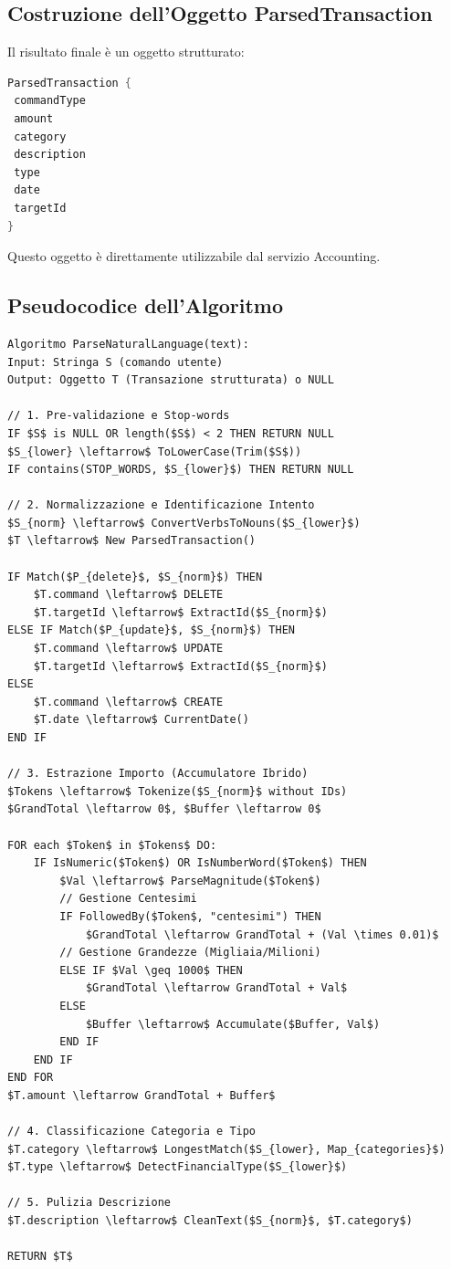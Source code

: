 \subsection{Costruzione dell'Oggetto ParsedTransaction}

Il risultato finale è un oggetto strutturato:

\bigskip

\begin{lstlisting}[language=Java]
ParsedTransaction {
 commandType
 amount
 category
 description
 type
 date
 targetId
}
\end{lstlisting}

Questo oggetto è direttamente utilizzabile dal servizio Accounting.

\subsection{Pseudocodice dell'Algoritmo}

\begin{lstlisting}[mathescape=true, basicstyle=\small\ttfamily]
Algoritmo ParseNaturalLanguage(text):
Input: Stringa S (comando utente)
Output: Oggetto T (Transazione strutturata) o NULL

// 1. Pre-validazione e Stop-words
IF $S$ is NULL OR length($S$) < 2 THEN RETURN NULL
$S_{lower} \leftarrow$ ToLowerCase(Trim($S$))
IF contains(STOP_WORDS, $S_{lower}$) THEN RETURN NULL

// 2. Normalizzazione e Identificazione Intento
$S_{norm} \leftarrow$ ConvertVerbsToNouns($S_{lower}$)
$T \leftarrow$ New ParsedTransaction()

IF Match($P_{delete}$, $S_{norm}$) THEN 
    $T.command \leftarrow$ DELETE
    $T.targetId \leftarrow$ ExtractId($S_{norm}$)
ELSE IF Match($P_{update}$, $S_{norm}$) THEN
    $T.command \leftarrow$ UPDATE
    $T.targetId \leftarrow$ ExtractId($S_{norm}$)
ELSE
    $T.command \leftarrow$ CREATE
    $T.date \leftarrow$ CurrentDate()
END IF

// 3. Estrazione Importo (Accumulatore Ibrido)
$Tokens \leftarrow$ Tokenize($S_{norm}$ without IDs)
$GrandTotal \leftarrow 0$, $Buffer \leftarrow 0$

FOR each $Token$ in $Tokens$ DO:
    IF IsNumeric($Token$) OR IsNumberWord($Token$) THEN
        $Val \leftarrow$ ParseMagnitude($Token$)
        // Gestione Centesimi
        IF FollowedBy($Token$, "centesimi") THEN
            $GrandTotal \leftarrow GrandTotal + (Val \times 0.01)$
        // Gestione Grandezze (Migliaia/Milioni)
        ELSE IF $Val \geq 1000$ THEN
            $GrandTotal \leftarrow GrandTotal + Val$
        ELSE
            $Buffer \leftarrow$ Accumulate($Buffer, Val$)
        END IF
    END IF
END FOR
$T.amount \leftarrow GrandTotal + Buffer$

// 4. Classificazione Categoria e Tipo
$T.category \leftarrow$ LongestMatch($S_{lower}, Map_{categories}$)
$T.type \leftarrow$ DetectFinancialType($S_{lower}$)

// 5. Pulizia Descrizione
$T.description \leftarrow$ CleanText($S_{norm}$, $T.category$)

RETURN $T$

\end{lstlisting}

